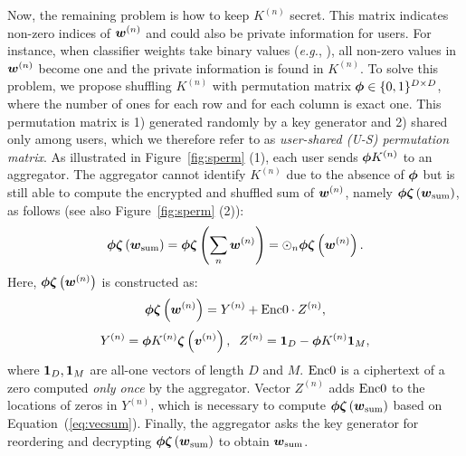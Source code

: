 \documentclass[10pt,twocolumn,letterpaper]{article}
\def\sub#1{_{\rm #1}}
\def\vct#1{\mbox{\boldmath $#1$}}
\def\eg{{\it e.g.}}
\def\ui#1{^{(#1)}}
\def\perm{\vct{\phi}}
\def\he#1{\vct{\zeta}\left(#1\right)}
\begin{document}
Now, the remaining problem is how to keep $K\ui{n}$ secret. This matrix indicates non-zero indices of $\vct{w}\ui{n}$ and could also be private information for users. For instance, when classifier weights take binary values (\eg, \cite{Cheng2014a,Courbariaux2015a,Hare2012a}), all non-zero values in $\vct{w}\ui{n}$ become one and the private information is found in $K\ui{n}$. To solve this problem, we propose shuffling $K\ui{n}$ with permutation matrix $\perm\in\{0, 1\}^{D\times D}$, where the number of ones for each row and for each column is exact one. This permutation matrix is 1) generated randomly by a key generator and 2) shared only among users, which we therefore refer to as \emph{user-shared (U-S) permutation matrix}. As illustrated in Figure~\ref{fig:sperm} (1), each user sends $\perm K\ui{n}$ to an aggregator. The aggregator cannot identify $K\ui{n}$ due to the absence of $\perm$ but is still able to compute the encrypted and shuffled sum of $\vct{w}\ui{n}$, namely $\perm\he{\vct{w}\sub{sum}}$, as follows (see also Figure~\ref{fig:sperm} (2)):
\begin{equation}
\perm\he{\vct{w}\sub{sum}}= \perm\he{\sum_n\vct{w}\ui{n}}=\odot_n \perm\he{\vct{w}\ui{n}}.
\label{eq:vecsum2}
\end{equation}
Here, $\perm\he{\vct{w}\ui{n}}$ is constructed as:
\begin{equation}
\perm\he{\vct{w}\ui{n}} = Y\ui{n} + {\rm Enc0}\cdot Z\ui{n},
\label{eq:hex}
\end{equation}
\begin{equation}
Y\ui{n}= \perm K\ui{n}\he{\vct{v}\ui{n}}, \;\; Z\ui{n}=\vct{1}_D - \perm K\ui{n}\vct{1}_M,
\label{eq:ViZi}
\end{equation}
where $\vct{1}_D, \vct{1}_M$ are all-one vectors of length $D$ and $M$. ${\rm Enc0}$ is a ciphertext of a zero computed \emph{only once} by the aggregator. Vector $Z\ui{n}$ adds ${\rm Enc0}$ to the locations of zeros in $Y\ui{n}$, which is necessary to compute $\perm\he{\vct{w}\sub{sum}}$ based on Equation~(\ref{eq:vecsum}).
Finally, the aggregator asks the key generator for reordering and decrypting $\perm\he{\vct{w}\sub{sum}}$ to obtain $\vct{w}\sub{sum}$.
\end{document}
